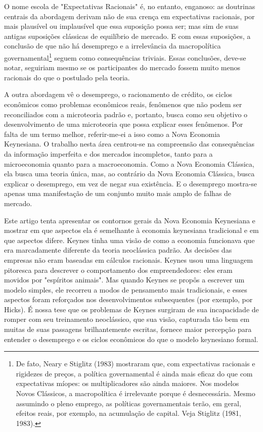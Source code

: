\documentclass[12pt]{article}
\begin{document}
O nome escola de "Expectativas Racionais" é, no entanto, enganoso: as doutrinas centrais da abordagem derivam não de sua crença em expectativas racionais, por mais plausível ou implausível que essa suposição possa ser; mas sim de suas antigas suposições clássicas de equilíbrio de mercado. E com essas suposições, a conclusão de que não há desemprego e a irrelevância da macropolítica governamental\footnote{De fato, Neary e Stiglitz (1983) mostraram que, com expectativas racionais e rigidezes de preços, a política governamental é ainda mais eficaz do que com expectativas míopes: os multiplicadores são ainda maiores. Nos modelos Novos Clássicos, a macropolítica é irrelevante porque é desnecessária. Mesmo assumindo o pleno emprego, as políticas governamentais terão, em geral, efeitos reais, por exemplo, na acumulação de capital. Veja Stiglitz (1981, 1983).} seguem como consequências triviais. Essas conclusões, deve-se notar, seguiriam mesmo se os participantes do mercado fossem muito menos racionais do que o postulado pela teoria.

A outra abordagem vê o desemprego, o racionamento de crédito, os ciclos econômicos como problemas econômicos reais, fenômenos que não podem ser reconciliados com a microteoria padrão e, portanto, busca como seu objetivo o desenvolvimento de uma microteoria que possa explicar esses fenômenos. Por falta de um termo melhor, referir-me-ei a isso como a Nova Economia Keynesiana. O trabalho nesta área centrou-se na compreensão das consequências da informação imperfeita e dos mercados incompletos, tanto para a microeconomia quanto para a macroeconomia. Como a Nova Economia Clássica, ela busca uma teoria única, mas, ao contrário da Nova Economia Clássica, busca explicar o desemprego, em vez de negar sua existência. E o desemprego mostra-se apenas uma manifestação de um conjunto muito mais amplo de falhas de mercado.

Este artigo tenta apresentar os contornos gerais da Nova Economia Keynesiana e mostrar em que aspectos ela é semelhante à economia keynesiana tradicional e em que aspectos difere. Keynes tinha uma visão de como a economia funcionava que era marcadamente diferente da teoria neoclássica padrão. As decisões das empresas não eram baseadas em cálculos racionais. Keynes usou uma linguagem pitoresca para descrever o comportamento dos empreendedores: eles eram movidos por "espíritos animais". Mas quando Keynes se propôs a escrever um modelo simples, ele recorreu a modos de pensamento mais tradicionais, e esses aspectos foram reforçados nos desenvolvimentos subsequentes (por exemplo, por Hicks). É nossa tese que os problemas de Keynes surgiram de sua incapacidade de romper com seu treinamento neoclássico, que sua visão, capturada tão bem em muitas de suas passagens brilhantemente escritas, fornece maior percepção para entender o desemprego e os ciclos econômicos do que o modelo keynesiano formal.
\end{document}
